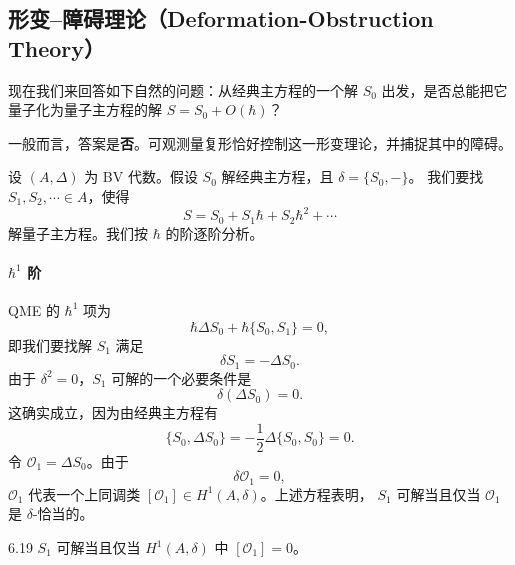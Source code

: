 \subsection{形变–障碍理论（Deformation-Obstruction Theory）}

现在我们来回答如下自然的问题：从经典主方程的一个解 $S_0$ 出发，是否总能把它
量子化为量子主方程的解 $S = S_0 + O(\hbar)$？

一般而言，答案是\textbf{否}。可观测量复形恰好控制这一形变理论，并捕捉其中的障碍。

设 $(A,\Delta)$ 为 BV 代数。假设 $S_0$ 解经典主方程，且 $\delta = \{S_0,-\}$。
我们要找 $S_1,S_2,\cdots\in A$，使得
\[
  S = S_0 + S_1\hbar + S_2\hbar^2 + \cdots
\]
解量子主方程。我们按 $\hbar$ 的阶逐阶分析。



\paragraph{$\hbar^1$ 阶}

QME 的 $\hbar^1$ 项为
\[
  \hbar\Delta S_0 + \hbar\{S_0,S_1\} = 0,
\]
即我们要找解 $S_1$ 满足
\[
  \delta S_1 = -\Delta S_0.
\]
由于 $\delta^2 = 0$，$S_1$ 可解的一个必要条件是
\[
  \delta(\Delta S_0) = 0.
\]
这确实成立，因为由经典主方程有
\[
  \{S_0,\Delta S_0\} = -\frac{1}{2}\Delta\{S_0,S_0\} = 0.
\]
令 $\mathcal{O}_1 = \Delta S_0$。由于
\[
  \delta\mathcal{O}_1 = 0,
\]
$\mathcal{O}_1$ 代表一个上同调类 $[\mathcal{O}_1]\in H^1(A,\delta)$。上述方程表明，
$S_1$ 可解当且仅当 $\mathcal{O}_1$ 是 $\delta$-恰当的。


\begin{wprop}{6.19}
  $S_1$ 可解当且仅当 $H^1(A,\delta)$ 中 $[\mathcal{O}_1] = 0$。
\end{wprop}

